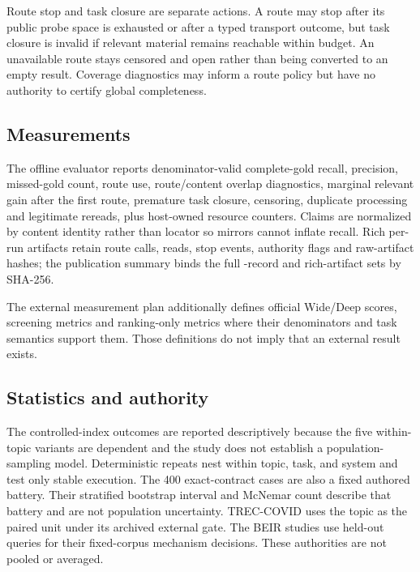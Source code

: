 Route stop and task closure are separate actions.  A route may stop after its
public probe space is exhausted or after a typed transport outcome, but task
closure is invalid if relevant material remains reachable within budget.  An
unavailable route stays censored and open rather than being converted to an
empty result.  Coverage diagnostics may inform a route policy but have no
authority to certify global completeness.

\subsection{Measurements}
The offline evaluator reports denominator-valid complete-gold recall, precision,
missed-gold count, route use, route/content overlap diagnostics, marginal
relevant gain after the first route, premature task closure, censoring,
duplicate processing and legitimate rereads, plus host-owned resource counters.
Claims are normalized by content identity rather than locator so mirrors cannot
inflate recall.  Rich per-run artifacts retain route calls, reads, stop events,
authority flags and raw-artifact hashes; the publication summary binds the full
\OfflineRunRecordCount{}-record and rich-artifact sets by SHA-256.

The external measurement plan additionally defines official Wide/Deep scores,
screening metrics and ranking-only metrics where their denominators and task
semantics support them.  Those definitions do not imply that an external result
exists.

\subsection{Statistics and authority}
The controlled-index outcomes are reported descriptively because the five
within-topic variants are dependent and the study does not establish a
population-sampling model. Deterministic repeats nest within topic, task, and
system and test only stable execution. The 400 exact-contract cases are also a
fixed authored battery. Their stratified bootstrap interval and McNemar count
describe that battery and are not population uncertainty. TREC-COVID uses the
topic as the paired unit under its archived external gate. The BEIR studies use
held-out queries for their fixed-corpus mechanism decisions. These authorities
are not pooled or averaged.

